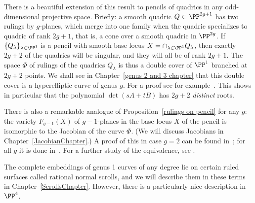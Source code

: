 \begin{fact}
 There is a beautiful extension of this result to pencils of quadrics in any odd-dimensional projective space. Briefly: a smooth quadric $Q \subset \PP^{2g+1}$ has two rulings by $g$-planes, which merge into one family when the quadric specializes to quadric of rank $2g+1$, that is, a cone over a smooth quadric in $\PP^{2g}$. If $\{Q_\lambda\}_{\lambda \in \PP^1}$ is a pencil with smooth base locus $X = \cap_{\lambda \in \PP^1} Q_\lambda$, then exactly $2g+2$ of the quadrics will be singular, and they will all be of rank $2g+1$. The space $\Phi$ of rulings of the quadrics $Q_\lambda$ is thus a double cover of $\PP^1$ branched at $2g+2$  points. We shall see in Chapter~\ref{genus 2 and 3 chapter} that this double cover is a hyperelliptic curve of genus $g$. For a proof see for example~\cite[Proposition 22.34]{Harris1995}.
 This shows in particular that the polynomial $\det(sA+tB)$ has $2g+2$ \emph{distinct} roots. 

 There is also a remarkable analogue of Proposition~\ref{rulings on pencil} for any $g$: the variety $F_{g-1}(X)$ of $g-1$-planes in the base locus $X$ of the pencil is isomorphic to the Jacobian of the  curve $\Phi$. (We will discuss Jacobians in Chapter~\ref{JacobianChapter}.) A proof of this in case $g=2$ can be found in~\cite{Griffiths-Harris1978}; for all $g$ it is done in~\cite{Donagi}. For a further study of the equivalence, see \cite{Eisenbud-Schreyer}.
\end{fact}

The complete embeddings of genus 1 curves of any degree lie on certain ruled surfaces called rational
normal scrolls, and we will describe them in these terms in Chapter~\ref{ScrollsChapter}. However, there is a particularly nice description in $\PP^4$. 

